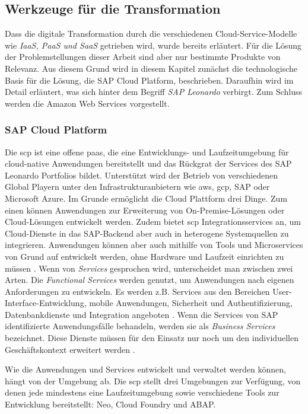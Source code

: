 \subsection{Werkzeuge für die Transformation} \label{toolset}

Dass die digitale Transformation durch die verschiedenen Cloud-Service-Modelle wie \textit{IaaS, PaaS und SaaS} getrieben wird, wurde bereits erläutert. Für die Lösung der Problemstellungen dieser Arbeit sind aber nur bestimmte Produkte von Relevanz. Aus diesem Grund wird in diesem Kapitel zunächst die technologische Basis für die Lösung, die SAP Cloud Platform, beschrieben. Daraufhin wird im Detail erläutert, was sich hinter dem Begriff \textit{SAP Leonardo} verbirgt. Zum Schluss werden die Amazon Web Services vorgestellt.  

\subsubsection{SAP Cloud Platform} \label{scp}

Die \acf{scp} ist eine offene \ac{paas}, die eine Entwicklungs- und Laufzeitumgebung für cloud-native Anwendungen bereitstellt und das Rückgrat der Services des SAP Leonardo Portfolios bildet. Unterstützt wird der Betrieb von verschiedenen Global Playern unter den Infrastrukturanbietern wie \ac{aws}, \ac{gcp}, SAP oder Microsoft Azure. Im Grunde ermöglicht die Cloud Plattform drei Dinge. Zum einen können Anwendungen zur Erweiterung von On-Premise-Lösungen oder Cloud-Lösungen entwickelt werden. Zudem bietet \ac{scp} Integrationsservices an, um Cloud-Dienste in das SAP-Backend aber auch in heterogene Systemquellen zu integrieren. Anwendungen können aber auch mithilfe von Tools und Microservices von Grund auf entwickelt werden, ohne Hardware und Laufzeit einrichten zu müssen \citep{Acharya2019}.
Wenn von \textit{Services} gesprochen wird, unterscheidet man zwischen zwei Arten.
Die \textit{Functional Services} werden genutzt, um Anwendungen nach eigenen Anforderungen zu entwickeln. Es werden z.B. Services aus den Bereichen User-Interface-Entwicklung, mobile Anwendungen, Sicherheit und Authentifizierung, Datenbankdienste und Integration angeboten \citep{Elsner2018}. Wenn die Services von SAP identifizierte Anwendungsfälle behandeln, werden sie als \textit{Business Services} bezeichnet. Diese Dienste müssen für den Einsatz nur noch um den individuellen Geschäftskontext erweitert werden \citep{Utecht2018}.

\noindent Wie die Anwendungen und Services entwickelt und verwaltet werden können, hängt von der Umgebung ab. Die \ac{scp} stellt drei Umgebungen zur Verfügung, von denen jede mindestens eine Laufzeitumgebung sowie verschiedene Tools zur Entwicklung bereitstellt: Neo, Cloud Foundry und ABAP.

